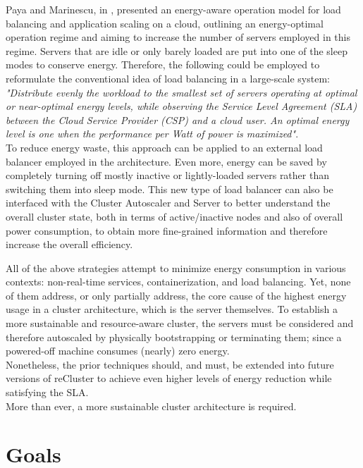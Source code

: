 Paya and Marinescu, in \cite{energy_aware_load_balancing}, presented an energy-aware
operation model for load balancing and application scaling on a cloud, outlining
an energy-optimal operation regime and aiming to increase the number of servers employed
in this regime. Servers that are idle or only barely loaded are put into one of
the sleep modes to conserve energy. Therefore, the following could be employed
to reformulate the conventional idea of load balancing in a large-scale system: \textit{"Distribute
evenly the workload to the smallest set of servers operating at optimal or near-optimal
energy levels, while observing the Service Level Agreement (SLA) between the Cloud
Service Provider (CSP) and a cloud user. An optimal energy level is one when the
performance per Watt of power is maximized"}. \\ %
To reduce energy waste, this approach can be applied to an external load balancer
employed in the architecture. Even more, energy can be saved by completely turning
off mostly inactive or lightly-loaded servers rather than switching them into sleep
mode. This new type of load balancer can also be interfaced with the Cluster
Autoscaler and Server to better understand the overall cluster state, both in terms
of active/inactive nodes and also of overall power consumption, to obtain more
fine-grained information and therefore increase the overall efficiency.

All of the above strategies attempt to minimize energy consumption in various
contexts: non-real-time services, containerization, and load balancing. Yet, none
of them address, or only partially address, the core cause of the highest energy
usage in a cluster architecture, which is the server themselves. To establish a more
sustainable and resource-aware cluster, the servers must be considered and
therefore autoscaled by physically bootstrapping or terminating them; since a powered-off
machine consumes (nearly) zero energy. \\ %
Nonetheless, the prior techniques should, and must, be extended into future
versions of reCluster to achieve even higher levels of energy reduction while
satisfying the SLA. \\ %
More than ever, a more sustainable cluster architecture is required.

\section{Goals}
\label{sec:introduction_goals}

